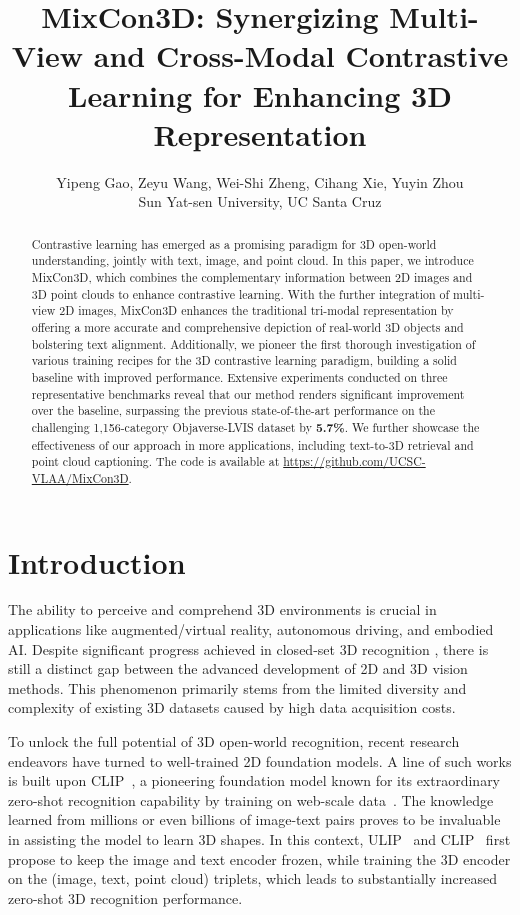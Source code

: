 \documentclass{article} \usepackage{iclr2024_conference,times}
\title{MixCon3D: Synergizing Multi-View and Cross-Modal Contrastive Learning for Enhancing 3D Representation}
\author{Yipeng Gao, Zeyu Wang, Wei-Shi Zheng, Cihang Xie, Yuyin Zhou  \vspace{.3em} \\
 Sun Yat-sen University,  UC Santa Cruz\\
}
\newcommand{\ourmethod}{MixCon3D}
\begin{document}
\maketitle
\begin{abstract}
Contrastive learning has emerged as a promising paradigm for 3D open-world understanding, jointly with text, image, and point cloud. 
In this paper, we introduce \ourmethod, which combines the complementary information between 2D images and 3D point clouds to enhance contrastive learning. With the further integration of multi-view 2D images, MixCon3D enhances the traditional tri-modal representation by offering a more accurate and comprehensive depiction of real-world 3D objects and bolstering text alignment. Additionally, we pioneer the first thorough investigation of various training recipes for the 3D contrastive learning paradigm, building a solid baseline with improved performance.
Extensive experiments conducted on three representative benchmarks reveal that our method renders significant improvement over the baseline, surpassing the previous state-of-the-art performance on the challenging 1,156-category Objaverse-LVIS dataset by \textbf{5.7\%}. 
We further showcase the effectiveness of our approach in more applications, including text-to-3D retrieval and point cloud captioning.
The code is available at \href{https://github.com/UCSC-VLAA/MixCon3D}{https://github.com/UCSC-VLAA/MixCon3D}.

\end{abstract}

\section{Introduction}
\label{sec:intro}
The ability to perceive and comprehend 3D environments is crucial in applications like augmented/virtual reality, autonomous driving, and embodied AI.
Despite significant progress achieved in closed-set 3D recognition \citep{pu-gcn, dynGCN, gcn_attn, pointnet, pointnet++, pointnext, point-bert, stratified_transformer, point_transformer}, there is still a distinct gap between the advanced development of 2D and 3D vision methods.
This phenomenon primarily stems from the limited diversity and complexity of existing 3D datasets caused by high data acquisition costs. 

To unlock the full potential of 3D open-world recognition,
recent research endeavors have turned to well-trained 2D foundation models. 
A line of such works is built upon CLIP~\citep{openai_clip}, a pioneering foundation model known for its extraordinary zero-shot recognition capability by training on web-scale data~\citep{laion400m, laion5b}. 
The knowledge learned from millions or even billions of image-text pairs proves to be invaluable in assisting the model to learn 3D shapes. 
In this context, ULIP~\citep{ulip} and CLIP~\citep{zeng2023clip2} first propose to keep the image and text encoder frozen, while training the 3D encoder on the (image, text, point cloud) triplets, which leads to substantially increased zero-shot 3D recognition performance. 
\end{document}
